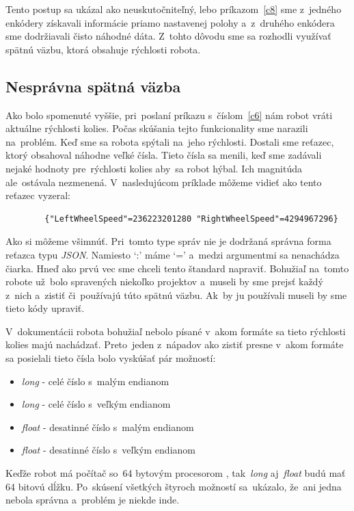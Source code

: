 Tento postup sa ukázal ako neuskutočniteľný, lebo príkazom~\ref{c8} sme z~jedného enkódery
získavali informácie priamo nastavenej polohy a~z~druhého enkódera sme dodržiavali čisto náhodné dáta.
Z~tohto dôvodu sme sa rozhodli využívať spätnú väzbu, ktorá obsahuje rýchlosti robota.

\subsection{Nesprávna spätná väzba}
\label{subsec:wrongFeedback}

Ako bolo spomenuté vyššie, pri~poslaní príkazu s~číslom~\ref{c6} nám robot vráti aktuálne rýchlosti kolies. Počas skúšania tejto funkcionality
sme narazili na~problém. Keď sme sa robota spýtali na~jeho rýchlosti. Dostali sme reťazec, ktorý obsahoval náhodne veľké čísla. Tieto čísla sa
menili, keď sme zadávali nejaké hodnoty pre~rýchlosti kolies aby~sa robot hýbal. Ich magnitúda ale~ostávala nezmenená. V~nasledujúcom príklade
môžeme vidieť ako tento reťazec vyzeral:

\label{jsonWannabeSpeed}
\begin{lstlisting}
		{"LeftWheelSpeed"=236223201280 "RightWheelSpeed"=4294967296}
\end{lstlisting}

Ako si môžeme všimnúť. Pri~tomto type správ nie je dodržaná správna forma reťazca typu \textit{JSON}.
Namiesto `:' máme `=' a~medzi argumentmi sa nenachádza čiarka. Hneď ako prvú vec sme chceli tento štandard napraviť. Bohužiaľ na~tomto
robote už~bolo spravených niekoľko projektov a~museli by sme prejsť každý z~nich a~zistiť či~používajú túto spätnú väzbu. Ak~by ju používali
museli by sme tieto kódy upraviť.

V~dokumentácii robota bohužiaľ nebolo písané v~akom formáte sa tieto rýchlosti kolies majú nachádzať. Preto~jeden z~nápadov ako zistiť presne
v~akom formáte sa posielali tieto čísla bolo vyskúšať pár možností:

\begin{itemize}
	\item \textit{long} - celé číslo s~malým endianom
	\item \textit{long} - celé číslo s~veľkým endianom
	\item \textit{float} - desatinné číslo s~malým endianom
	\item \textit{float} - desatinné číslo s~veľkým endianom
\end{itemize}

Keďže robot má počítač so~64 bytovým procesorom \cite{robotPc}, tak~\textit{long} aj~\textit{float} budú mať 64 bitovú dĺžku. Po~skúsení všetkých
štyroch možností sa~ukázalo, že~ani jedna nebola správna a~problém je niekde inde.

